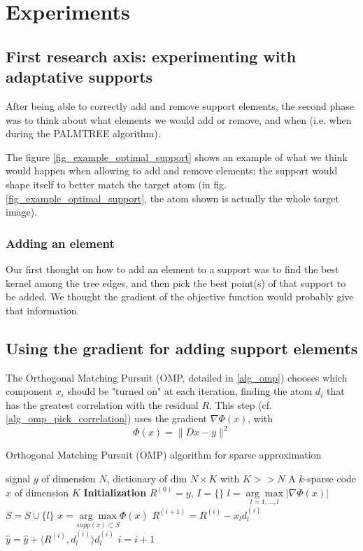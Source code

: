 \chapter{Experiments}

\section{First research axis: experimenting with adaptative supports}

After being able to correctly add and remove support elements, the second phase was to think about what elements we would add or remove, and when (i.e. when during the PALMTREE algorithm).

The figure \ref{fig_example_optimal_support} shows an example of what we think would happen when allowing to add and remove elements: the support would shape itself to better match the target atom (in fig.\ref{fig_example_optimal_support}, the atom shown is actually the whole target image).


\subsection{Adding an element}
Our first thought on how to add an element to a support was to find the best kernel among the tree edges, and then pick the best point(s) of that support to be added. We thought the gradient of the objective function would probably give that information. 







\section{Using the gradient for adding support elements}

The Orthogonal Matching Pursuit (OMP, detailed in \cref{alg_omp}) chooses which component $x_i$ should be "turned on" at each iteration, finding the atom $d_i$ that has the greatest correlation with the residual $R$. This step (cf. \cref{alg_omp_pick_correlation}) uses the gradient $\nabla \Phi(x)$, with $$\Phi(x) = \lVert Dx - y \rVert^2$$


\begin{algorithm}[!ht] %
    \caption{Orthogonal Matching Pursuit (OMP) algorithm for sparse approximation}\label{alg_omp}
  \begin{algorithmic}[0]
    \Input signal $y$ of dimension $N$, dictionary of dim $N \times K$ with $K>>N$
    \Output A $k$-sparse code $x$ of dimension $K$
    \State \textbf{Initialization} $R^{(0)} = y$, $I=\{\}$
      \State $l =  \underset{l = 1,\dots,l}{\arg\max} | \nabla \Phi(x) |$ \label{alg_omp_pick_correlation}
      \State $S = S \cup \{l\}$
      \State $x = \underset{supp(x) \subset S}{\arg\max} \Phi(x)$
      \State $R^{(i+1)} = R^{(i)}-x_l d_l^{(i)}$
      \State $\hat{y} = \hat{y}+\langle R^{(i)}, d_{l}^{(i)} \rangle d_{l}^{(i)}$
      \State $i = i + 1$
    \EndWhile
  \end{algorithmic}
\end{algorithm}

